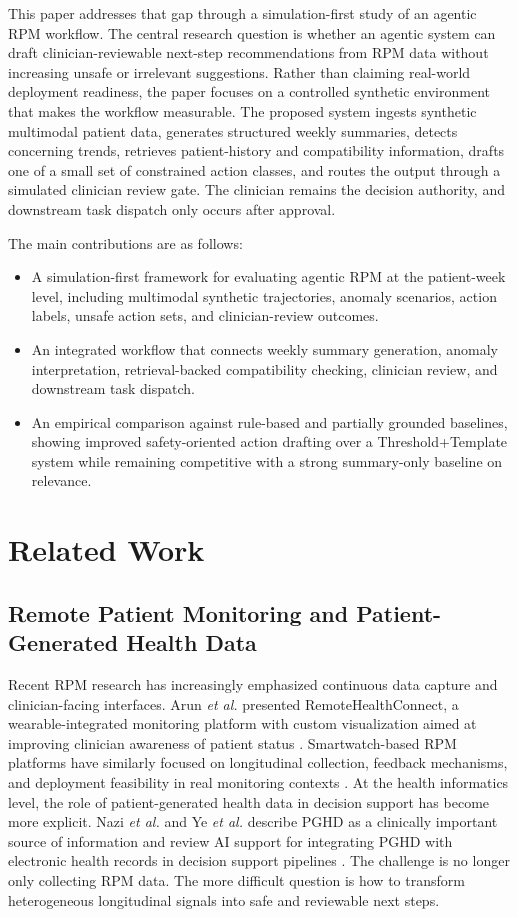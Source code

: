 \documentclass[conference]{IEEEtran}
\begin{document}
This paper addresses that gap through a simulation-first study of an agentic RPM workflow. The central research question is whether an agentic system can draft clinician-reviewable next-step recommendations from RPM data without increasing unsafe or irrelevant suggestions. Rather than claiming real-world deployment readiness, the paper focuses on a controlled synthetic environment that makes the workflow measurable. The proposed system ingests synthetic multimodal patient data, generates structured weekly summaries, detects concerning trends, retrieves patient-history and compatibility information, drafts one of a small set of constrained action classes, and routes the output through a simulated clinician review gate. The clinician remains the decision authority, and downstream task dispatch only occurs after approval.

The main contributions are as follows:
\begin{itemize}
\item A simulation-first framework for evaluating agentic RPM at the patient-week level, including multimodal synthetic trajectories, anomaly scenarios, action labels, unsafe action sets, and clinician-review outcomes.
\item An integrated workflow that connects weekly summary generation, anomaly interpretation, retrieval-backed compatibility checking, clinician review, and downstream task dispatch.
\item An empirical comparison against rule-based and partially grounded baselines, showing improved safety-oriented action drafting over a Threshold+Template system while remaining competitive with a strong summary-only baseline on relevance.
\end{itemize}

\section{Related Work}

\subsection{Remote Patient Monitoring and Patient-Generated Health Data}

Recent RPM research has increasingly emphasized continuous data capture and clinician-facing interfaces. Arun \textit{et al.} presented RemoteHealthConnect, a wearable-integrated monitoring platform with custom visualization aimed at improving clinician awareness of patient status \cite{arun2024remotehealthconnect}. Smartwatch-based RPM platforms have similarly focused on longitudinal collection, feedback mechanisms, and deployment feasibility in real monitoring contexts \cite{activeDCM2024}. At the health informatics level, the role of patient-generated health data in decision support has become more explicit. Nazi \textit{et al.} and Ye \textit{et al.} describe PGHD as a clinically important source of information and review AI support for integrating PGHD with electronic health records in decision support pipelines \cite{nazi2024pghd,ye2024pghd}. The challenge is no longer only collecting RPM data. The more difficult question is how to transform heterogeneous longitudinal signals into safe and reviewable next steps.
\end{document}
